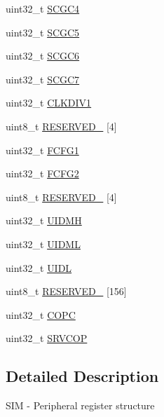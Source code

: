 \begin{DoxyCompactItemize}
\item 
uint32\+\_\+t \hyperlink{struct_s_i_m___mem_map_a10c826c9197f80b94fa050a36943e871}{S\+C\+G\+C4}
\item 
uint32\+\_\+t \hyperlink{struct_s_i_m___mem_map_ae622490033273b25b5ba0e17600368cd}{S\+C\+G\+C5}
\item 
uint32\+\_\+t \hyperlink{struct_s_i_m___mem_map_aee7123ada2dcba294b1f26615f2cc689}{S\+C\+G\+C6}
\item 
uint32\+\_\+t \hyperlink{struct_s_i_m___mem_map_ab3ec649af457836a31a78fa8d2c4388a}{S\+C\+G\+C7}
\item 
uint32\+\_\+t \hyperlink{struct_s_i_m___mem_map_ae56d33007aecc902d1394c2adca212af}{C\+L\+K\+D\+I\+V1}
\item 
uint8\+\_\+t \hyperlink{struct_s_i_m___mem_map_ab95a859ed80f2b72b5538bcc1806d924}{R\+E\+S\+E\+R\+V\+E\+D\+\_} \mbox{[}4\mbox{]}
\item 
uint32\+\_\+t \hyperlink{struct_s_i_m___mem_map_ab2a9ce086973740fcd958ea83a6967f2}{F\+C\+F\+G1}
\item 
uint32\+\_\+t \hyperlink{struct_s_i_m___mem_map_a548bbc722cef80f7bc9624f1309964c1}{F\+C\+F\+G2}
\item 
uint8\+\_\+t \hyperlink{struct_s_i_m___mem_map_a4e4f1fbee587e08a2b02ff956746fb74}{R\+E\+S\+E\+R\+V\+E\+D\+\_} \mbox{[}4\mbox{]}
\item 
uint32\+\_\+t \hyperlink{struct_s_i_m___mem_map_a599672d7e15a6f7a2b774a3b06e0e9cc}{U\+I\+D\+MH}
\item 
uint32\+\_\+t \hyperlink{struct_s_i_m___mem_map_ac0ca2251290fdadcaf84fbe3a7534b6d}{U\+I\+D\+ML}
\item 
uint32\+\_\+t \hyperlink{struct_s_i_m___mem_map_a339fceb110e65a719f4566c52270be8e}{U\+I\+DL}
\item 
uint8\+\_\+t \hyperlink{struct_s_i_m___mem_map_a2139860497710bc375266dc42d96ee6c}{R\+E\+S\+E\+R\+V\+E\+D\+\_} \mbox{[}156\mbox{]}
\item 
uint32\+\_\+t \hyperlink{struct_s_i_m___mem_map_a4af8557704666ca737fef4ed12200093}{C\+O\+PC}
\item 
uint32\+\_\+t \hyperlink{struct_s_i_m___mem_map_a4c7ae6df8582f270aeacca029b051335}{S\+R\+V\+C\+OP}
\end{DoxyCompactItemize}


\subsection{Detailed Description}
S\+IM -\/ Peripheral register structure 

